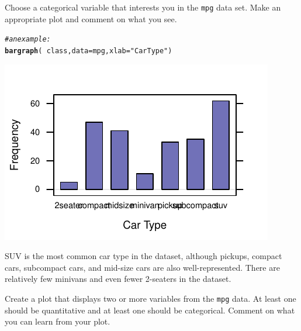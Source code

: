 \documentclass[twoside]{book}\usepackage[]{graphicx}\usepackage[]{xcolor}
\makeatletter
\def\maxwidth{ %
  \ifdim\Gin@nat@width>\linewidth
    \linewidth
  \else
    \Gin@nat@width
  \fi
}
\newcommand{\hlstr}[1]{\textcolor[rgb]{0.192,0.494,0.8}{#1}}%
\newcommand{\hlcom}[1]{\textcolor[rgb]{0.678,0.584,0.686}{\textit{#1}}}%
\newcommand{\hlopt}[1]{\textcolor[rgb]{0,0,0}{#1}}%
\newcommand{\hlstd}[1]{\textcolor[rgb]{0.345,0.345,0.345}{#1}}%
\newcommand{\hlkwc}[1]{\textcolor[rgb]{0.333,0.667,0.333}{#1}}%
\newcommand{\hlkwd}[1]{\textcolor[rgb]{0.737,0.353,0.396}{\textbf{#1}}}%
\newenvironment{kframe}{%
 \def\at@end@of@kframe{}%
 \ifinner\ifhmode%
  \def\at@end@of@kframe{\end{minipage}}%
  \begin{minipage}{\columnwidth}%
 \fi\fi%
 \def\FrameCommand##1{\hskip\@totalleftmargin \hskip-\fboxsep
 \colorbox{shadecolor}{##1}\hskip-\fboxsep
     \hskip-\linewidth \hskip-\@totalleftmargin \hskip\columnwidth}%
 \MakeFramed {\advance\hsize-\width
   \@totalleftmargin\z@ \linewidth\hsize
   \@setminipage}}%
 {\par\unskip\endMakeFramed%
 \at@end@of@kframe}
\newenvironment{knitrout}{}{} %
\newcommand{\Rindex}[1]{\index{\texttt{#1}}}
\newcommand{\dataframe}[1]{{\color{blue!80!black}\texttt{#1}}\Rindex{#1}}
\newcounter{example}[section]
\makeatother
\begin{document}
\begin{problem}
	Choose a categorical variable that interests you in the \dataframe{mpg}
	data set.  Make an appropriate plot and comment on what you see.
\end{problem}
\begin{solution}
\begin{knitrout}
\color{fgcolor}\begin{kframe}
\begin{alltt}
\hlcom{# an example:}
\hlkwd{bargraph}\hlstd{(}\hlopt{~}\hlstd{class,} \hlkwc{data} \hlstd{= mpg,} \hlkwc{xlab} \hlstd{=} \hlstr{"Car Type"}\hlstd{)}
\end{alltt}
\end{kframe}

{\centering \includegraphics[width=\maxwidth]{figures/fig-unnamed-chunk-27-1} 

}



\end{knitrout}
SUV is the most common car type in the dataset, although pickups, compact cars, subcompact cars, and mid-size cars are also well-represented.  There are relatively few minivans and even fewer 2-seaters in the dataset.
\end{solution}

\begin{problem}
	Create a plot that displays two or more variables from the 
	\dataframe{mpg} data.  At least one should be quantitative 
	and at least one should be categorical.
	Comment on what you can learn from your plot.
\end{problem}
\end{document}

